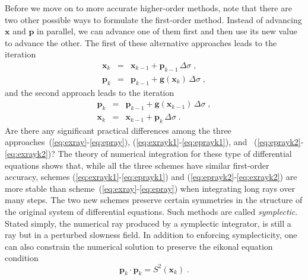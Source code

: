 Before we move on to more accurate higher-order methods, note that there are
two other possible ways to formulate the first-order method. Instead of
advancing $\mathbf{x}$ and $\mathbf{p}$ in parallel, we can advance one of
them first and then use its new value to advance the other. The first of these
alternative approaches leads to the iteration
\begin{eqnarray}
  \label{eq:exrayk1}
  \mathbf{x}_k & = & \mathbf{x}_{k-1} + \mathbf{p}_{k-1}\,\Delta \sigma\;, \\
  \label{eq:eprayk1}
  \mathbf{p}_k & = & \mathbf{p}_{k-1} + \mathbf{g}(\mathbf{x}_{k})\,
  \Delta \sigma\;,
\end{eqnarray}
and the second approach leads to the iteration
\begin{eqnarray}
  \label{eq:eprayk2}
  \mathbf{p}_k & = & \mathbf{p}_{k-1} + \mathbf{g}(\mathbf{x}_{k-1})\,
  \Delta \sigma\;, 
  \\
  \label{eq:exrayk2}
  \mathbf{x}_k & = & \mathbf{x}_{k-1} + \mathbf{p}_{k}\,\Delta \sigma\;.
\end{eqnarray}
Are there any significant practical differences among the three
approaches~(\ref{eq:exray}-\ref{eq:epray}),
(\ref{eq:exrayk1}-\ref{eq:eprayk1}), and
~(\ref{eq:eprayk2}-\ref{eq:exrayk2})? The theory of numerical
integration for these type of differential equations shows that, while
all the three schemes have similar first-order accuracy, schemes
(\ref{eq:exrayk1}-\ref{eq:eprayk1}) and
(\ref{eq:eprayk2}-\ref{eq:exrayk2}) are more stable than
scheme~(\ref{eq:exray}-\ref{eq:epray}) when integrating long rays over
many steps. The two new schemes preserve certain symmetries in the
structure of the original system of differential equations. Such
methods are called \emph{symplectic}. Stated simply, the numerical ray
produced by a symplectic integrator, is still a ray but in a perturbed
slowness field.
In addition to enforcing symplecticity, one can also constrain the
numerical solution to preserve the eikonal equation condition
\begin{equation}
  \label{eq:eikonal}
  \mathbf{p}_k \cdot \mathbf{p}_k = S^2(\mathbf{x}_k)\;.
\end{equation}

